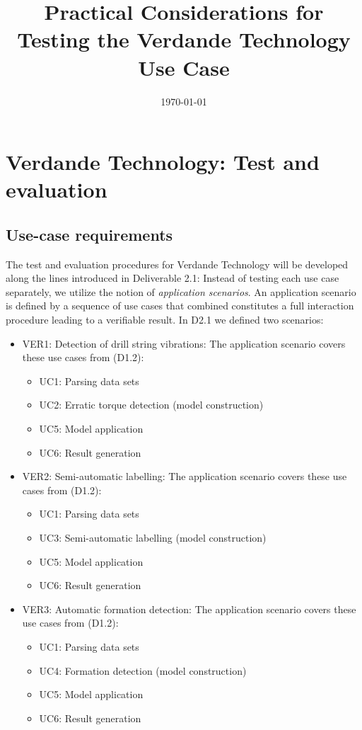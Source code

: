 \documentclass{article}
\title{Practical Considerations for Testing the Verdande Technology Use Case}
\date{\today}
\theoremstyle{theorem}
\theoremstyle{definition}
\begin{document}
\maketitle


\section{Verdande Technology: Test and evaluation}



\subsection{Use-case requirements}

The test and evaluation procedures for Verdande Technology will be developed along the lines introduced in Deliverable 2.1: Instead of testing each use case separately, we utilize the notion of {\em application scenarios}. 
An application scenario is defined by a sequence of use cases that combined constitutes a full interaction procedure leading to a verifiable result. In D2.1 we defined two scenarios:

\begin{itemize}
\item VER1: 
Detection of drill string vibrations:
The application scenario covers these use cases from (D1.2):
\begin{itemize}
\item UC1: Parsing data sets
\item UC2: Erratic torque detection (model construction)
\item UC5: Model application
\item UC6: Result generation
\end{itemize}

\item VER2: Semi-automatic labelling:
The application scenario covers these use cases from (D1.2):
\begin{itemize}
\item UC1: Parsing data sets
\item UC3: Semi-automatic labelling (model construction)
\item UC5: Model application
\item UC6: Result generation
\end{itemize}

\item VER3: Automatic formation detection:
The application scenario covers these use cases from (D1.2):
\begin{itemize}
\item UC1: Parsing data sets
\item UC4: Formation detection (model construction)
\item UC5: Model application
\item UC6: Result generation
\end{itemize}

\end{itemize}
\end{document}
